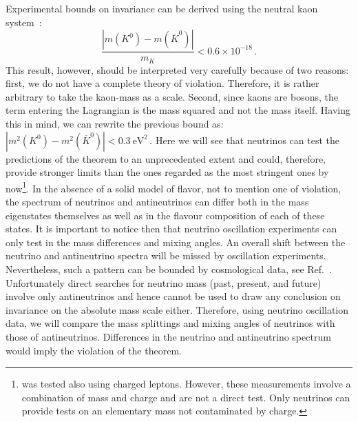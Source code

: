 Experimental bounds on  invariance can be derived using the neutral kaon system~\cite{Schwingenheuer:1995uf}:
%
\begin{equation}
  \frac{|m(K^0) - m(\overline{K}^0)|}{m_K} < 0.6 \times 10^{-18}\,. 
  \label{eq:mK}
\end{equation}
%
This result, however, should be interpreted very carefully because of two reasons: first, we do not have a complete theory of  violation. Therefore, it is rather arbitrary to take the kaon-mass as a scale. Second, since kaons are bosons, the term entering the Lagrangian is the mass squared and not the mass itself. Having this in mind, we can rewrite the previous bound as:
%
 $ |m^2(K^0) - m^2(\overline{K}^0)| < 0.3~\mbox{eV}^2 \, $.
%
Here we will see that neutrinos can test the predictions of the  theorem to an unprecedented extent and could, therefore, provide stronger limits than the ones regarded as the most stringent ones by now\footnote{ was tested also using charged leptons. However, these measurements involve a combination
of mass and charge and are not a direct  test. Only neutrinos can provide  tests on an elementary mass not contaminated by charge.}. 
%
In the absence of a solid model of flavor, not to mention one of  violation, the spectrum  of neutrinos and antineutrinos can differ both  in the mass eigenstates themselves as well as in the flavour composition of each of these states. It is important to notice then that neutrino oscillation experiments can  only test  in the mass differences and mixing angles. An overall shift between the neutrino and antineutrino spectra will be missed by oscillation experiments.  Nevertheless, such a pattern can be bounded by cosmological data, see Ref.~\cite{Barenboim:2017vlc}. Unfortunately direct searches for neutrino mass (past, present, and future) involve only antineutrinos and hence 
cannot be used to draw any conclusion on   invariance on the absolute mass scale either.
%
Therefore, using neutrino oscillation data, we will compare the mass splittings and mixing angles of  neutrinos with those of antineutrinos. Differences in the neutrino and antineutrino spectrum would imply the violation of the  theorem.

